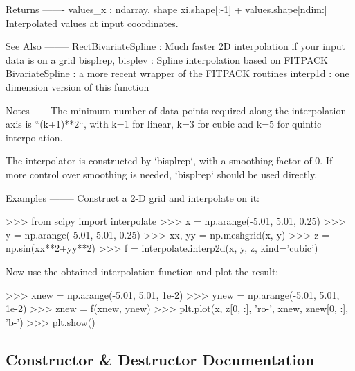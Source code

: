 \begin{DoxyVerb}
Returns
-------
values_x : ndarray, shape xi.shape[:-1] + values.shape[ndim:]
    Interpolated values at input coordinates.

See Also
--------
RectBivariateSpline :
    Much faster 2D interpolation if your input data is on a grid
bisplrep, bisplev :
    Spline interpolation based on FITPACK
BivariateSpline : a more recent wrapper of the FITPACK routines
interp1d : one dimension version of this function

Notes
-----
The minimum number of data points required along the interpolation
axis is ``(k+1)**2``, with k=1 for linear, k=3 for cubic and k=5 for
quintic interpolation.

The interpolator is constructed by `bisplrep`, with a smoothing factor
of 0. If more control over smoothing is needed, `bisplrep` should be
used directly.

Examples
--------
Construct a 2-D grid and interpolate on it:

>>> from scipy import interpolate
>>> x = np.arange(-5.01, 5.01, 0.25)
>>> y = np.arange(-5.01, 5.01, 0.25)
>>> xx, yy = np.meshgrid(x, y)
>>> z = np.sin(xx**2+yy**2)
>>> f = interpolate.interp2d(x, y, z, kind='cubic')

Now use the obtained interpolation function and plot the result:

>>> xnew = np.arange(-5.01, 5.01, 1e-2)
>>> ynew = np.arange(-5.01, 5.01, 1e-2)
>>> znew = f(xnew, ynew)
>>> plt.plot(x, z[0, :], 'ro-', xnew, znew[0, :], 'b-')
>>> plt.show()\end{DoxyVerb}
 

\subsection{Constructor \& Destructor Documentation}
\hypertarget{classscipy_1_1interpolate_1_1interpolate_1_1interp2d_a7bb7569e49bfe29d8b22ef46462da961}{}
